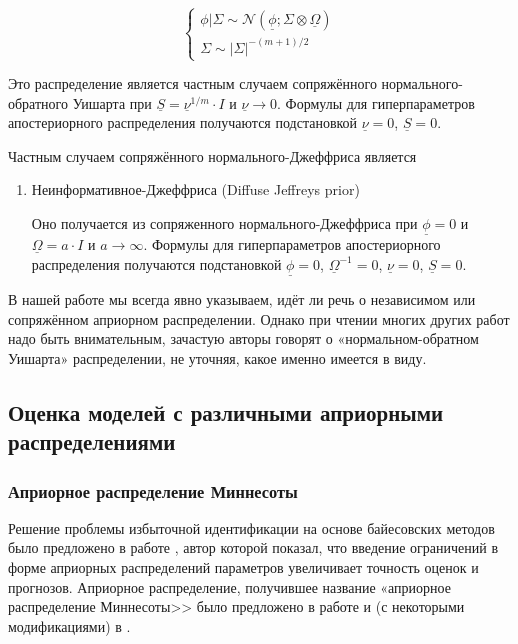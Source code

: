 \documentclass[11pt]{article} %
\newcommand{\cN}{\mathcal{N}}
\newcommand{\prior}{\underline}
\begin{document}
\begin{enumerate}
\begin{enumerate}
\begin{equation}
\begin{cases}
\phi | \Sigma \sim \cN(\prior\phi; \Sigma \otimes \prior\Omega ) \\
\Sigma \sim |\Sigma|^{-(m+1)/2}
\end{cases}
\end{equation}




Это распределение является частным случаем сопряжённого нормального-обратного Уишарта при $\prior S
= \prior \nu^{1/m}\cdot I$ и  $\prior \nu \to 0$.  Формулы для
гиперпараметров апостериорного распределения получаются подстановкой
$\prior\nu=0$, $\prior S=0$.


Частным случаем сопряжённого нормального-Джеффриса является

\begin{enumerate}

\item Неинформативное-Джеффриса (Diffuse Jeffreys prior)


Оно получается из сопряженного нормального-Джеффриса при $\prior\phi=0$ и
$\prior\Omega= a\cdot I$ и $a\to \infty$. Формулы для гиперпараметров
апостериорного распределения получаются подстановкой $\prior\phi=0$,
$\prior\Omega^{-1}=0$, $\prior\nu=0$, $\prior S=0$.

\end{enumerate}



\end{enumerate}


\end{enumerate}


В нашей работе мы всегда явно указываем, идёт ли речь о независимом
или сопряжённом априорном распределении. Однако при чтении многих
других работ надо быть внимательным, зачастую авторы говорят о
«нормальном-обратном Уишарта» распределении, не уточняя, какое  именно имеется
в виду.

\subsection{Оценка моделей с различными априорными распределениями}
\subsubsection{Априорное распределение Миннесоты}


Решение проблемы избыточной идентификации на основе байесовских методов было предложено в работе \cite{litterman_1979}, автор которой показал, что введение ограничений в форме априорных распределений параметров увеличивает точность оценок и прогнозов. Априорное распределение, получившее название «априорное распределение Миннесоты>> было предложено в работе  \cite{litterman_1986} и (с некоторыми модификациями) в \cite{doan_al_1984}.
\end{document}
